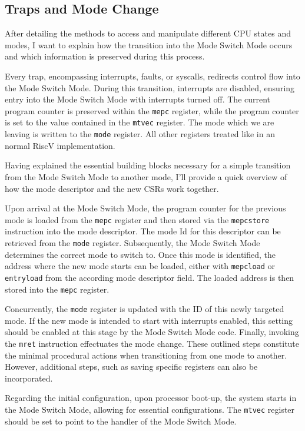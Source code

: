 \subsection{Traps and Mode Change}
After detailing the methods to access and manipulate different CPU states and
modes, I want to explain how the transition into the Mode Switch Mode
occurs and which information is preserved during this process.\par
Every trap, encompassing interrupts, faults, or syscalls, redirects control flow
into the Mode Switch Mode. During this transition, interrupts are disabled,
ensuring entry into the Mode Switch Mode with interrupts turned off. The current
program counter is preserved within the \texttt{mepc} register, while the program counter
is set to the value contained in the \texttt{mtvec} register. The mode which we
are leaving is written to the \texttt{mode} register. All other registers treated like in
an normal RiscV implementation.\par
\vspace{12pt}
Having explained the essential building blocks necessary for a
simple transition from the Mode Switch Mode to another mode, I'll provide a
quick overview of how the mode descriptor and the new CSRs work together.\par
Upon arrival at the Mode Switch Mode, the program counter for the previous mode
is loaded from the \texttt{mepc} register and then stored via the
\texttt{mepcstore} instruction into the mode descriptor. The mode Id for this
descriptor can be retrieved from the \texttt{mode} register. Subsequently, the Mode Switch Mode determines
the correct mode to switch to. Once this mode is identified, the address where
the new mode starts can be loaded, either with \texttt{mepcload} or
\texttt{entryload} from the according mode descriptor field. The loaded address
is then stored into the \texttt{mepc} register.\par 
Concurrently, the \texttt{mode} register is updated with the ID of this newly
targeted mode. If the new mode is intended to start with interrupts enabled,
this setting should be enabled at this stage by the Mode Switch Mode code.
Finally, invoking the \texttt{mret} instruction effectuates the mode change.
These outlined steps constitute the minimal procedural actions when
transitioning from one mode to another. However, additional steps, such as
saving specific registers  can also be incorporated.\par
Regarding the initial configuration, upon processor boot-up, the system
starts in the Mode Switch Mode, allowing for essential configurations. The
\texttt{mtvec} register should be set to point to the handler of the Mode Switch Mode.

